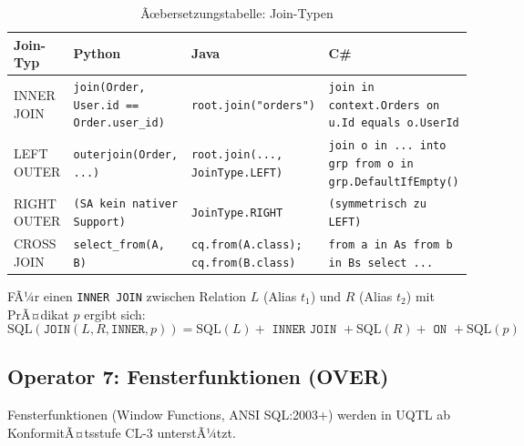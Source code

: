 \begin{table}
\centering
\caption{Ãœbersetzungstabelle: Join-Typen}
\label{tab:join_ops}
\renewcommand{\arraystretch}{1.4}
\begin{tabularx}{\textwidth}{lXXX}
\toprule
\textbf{Join-Typ} & \textbf{Python} & \textbf{Java} & \textbf{C\#} \\
\midrule
INNER JOIN
  & \texttt{join(Order, User.id == Order.user\_id)}
  & \texttt{root.join("orders")}
  & \texttt{join in context.Orders on u.Id equals o.UserId} \\
LEFT OUTER
  & \texttt{outerjoin(Order, ...)}
  & \texttt{root.join(..., JoinType.LEFT)}
  & \texttt{join o in ... into grp from o in grp.DefaultIfEmpty()} \\
RIGHT OUTER
  & \texttt{(SA kein nativer Support)}
  & \texttt{JoinType.RIGHT}
  & \texttt{(symmetrisch zu LEFT)} \\
CROSS JOIN
  & \texttt{select\_from(A, B)}
  & \texttt{cq.from(A.class); cq.from(B.class)}
  & \texttt{from a in As from b in Bs select ...} \\
\bottomrule
\end{tabularx}
\end{table}

\begin{regel}
\label{regel:join}
FÃ¼r einen \texttt{INNER JOIN} zwischen Relation $L$ (Alias $t_1$) und $R$ (Alias $t_2$)
mit PrÃ¤dikat $p$ ergibt sich:
\[
\mathrm{SQL}(\mathtt{JOIN}(L, R, \mathtt{INNER}, p)) =
  \mathrm{SQL}(L) + \texttt{ INNER JOIN } + \mathrm{SQL}(R) +
  \texttt{ ON } + \mathrm{SQL}(p)
\]
\end{regel}

\subsection{Operator 7: Fensterfunktionen (OVER)}
\label{subsec:op_window}

Fensterfunktionen (Window Functions, ANSI SQL:2003+) werden in UQTL ab
KonformitÃ¤tsstufe CL-3 unterstÃ¼tzt.

